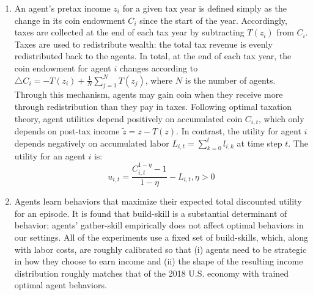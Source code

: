\documentclass{article}
\begin{document}
\begin{enumerate}
	\item An agent’s pretax income \( z_{i} \) for a given tax year is defined simply as the change in its coin endowment \( C_{i} \) since the start of the year. Accordingly, taxes are collected at the end of each tax year by subtracting \( T(z_{i}) \) from \( C_{i} \). Taxes are used to redistribute wealth: the total tax revenue is evenly redistributed back to the agents. In total, at the end of each tax year, the coin endowment for agent \( i \) changes according to \( \bigtriangleup C_{i} = - T(z_{i}) + \frac{1}{N} \sum_{j = 1}^{N} T(z_{j}) \), where \( N \) is the number of agents. Through this mechanism, agents may gain coin when they receive more through redistribution than they pay in taxes. Following optimal taxation theory, agent utilities depend positively on accumulated coin \( C_{i, t} \), which only depends on post-tax income \( \tilde{z}  = z - T(z) \). In contrast, the utility for agent \( i \) depends negatively on accumulated labor \( L_{i, t} = \sum_{k = 0}^{t} l_{i, k} \) at time step \( t \). The utility for an agent \( i \) is:
	\begin{equation}\label{Equation4}
		u_{i, t} = \frac{C^{1 - \eta}_{i, t} - 1}{1 - \eta} - L_{i, t}, \eta > 0
	\end{equation}

	\item Agents learn behaviors that maximize their expected total discounted utility for an episode. It is found that build-skill is a substantial determinant of behavior; agents’ gather-skill empirically does not affect optimal behaviors in our settings. All of the experiments use a fixed set of build-skills, which, along with labor costs, are roughly calibrated so that (i) agents need to be strategic in how they choose to earn income and (ii) the shape of the resulting income distribution roughly matches that of the 2018 U.S. economy with trained optimal agent behaviors.
	

\end{enumerate}
\end{document}
